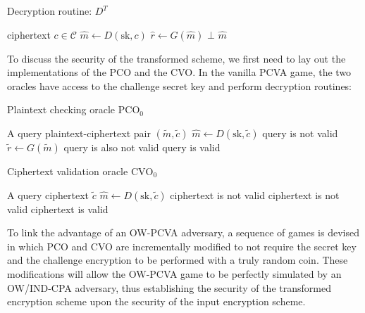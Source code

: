 \documentclass{article}
\begin{document}
\begin{algorithm}
    \caption[decrypt-t]{Decryption routine: $D^T$}
    \begin{algorithmic}[1]
        \Require ciphertext $c \in \mathcal{C}$
        \State $\hat{m} \leftarrow D(\text{sk}, c)$
        \State $\hat{r} \leftarrow G(\hat{m})$
            \State \Return $\bot$
        \EndIf
        \State \Return $\hat{m}$
    \end{algorithmic}
\end{algorithm}

To discuss the security of the transformed scheme, we first need to lay out the implementations of the PCO and the CVO. In the vanilla PCVA game, the two oracles have access to the challenge secret key and perform decryption routines:


\begin{algorithm}
    \caption[pco-0]{Plaintext checking oracle $\text{PCO}_0$}
    \begin{algorithmic}[1]
        \Require A query plaintext-ciphertext pair $(\tilde{m}, \tilde{c})$
        \State $\hat{m} \leftarrow D(\text{sk}, \tilde{c})$
            \State {} \Comment query is not valid
        \EndIf
        \State $\tilde{r} \leftarrow G(\tilde{m})$
            \State {}  \Comment query is also not valid
        \EndIf
        \State {}  \Comment query is valid
    \end{algorithmic}
\end{algorithm}

\begin{algorithm}
    \caption[cvo-0]{Ciphertext validation oracle $\text{CVO}_0$}
    \begin{algorithmic}[1]
        \Require A query ciphertext $\tilde{c}$
        \State $\hat{m} \leftarrow D(\text{sk}, \tilde{c})$
            \State {} \Comment ciphertext is not valid
            \State {} \Comment ciphertext is not valid
        \EndIf
        \State {}  \Comment ciphertext is valid
    \end{algorithmic}
\end{algorithm}
\pagebreak

To link the advantage of an OW-PCVA adversary, a sequence of games is devised in which PCO and CVO are incrementally modified to not require the secret key and the challenge encryption to be performed with a truly random coin. These modifications will allow the OW-PCVA game to be perfectly simulated by an OW/IND-CPA adversary, thus establishing the security of the transformed encryption scheme upon the security of the input encryption scheme.
\end{document}
